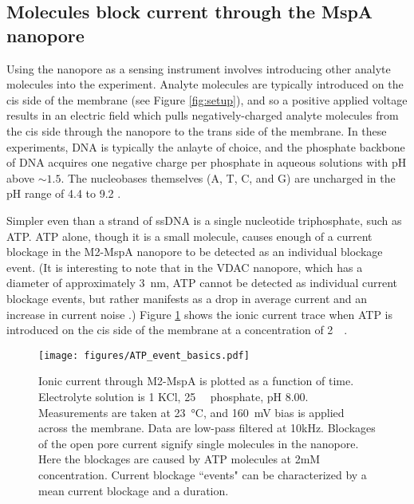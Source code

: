 \subsection{Molecules block current through the MspA nanopore}

Using the nanopore as a sensing instrument involves introducing other analyte molecules into the experiment.  Analyte molecules are typically introduced on the cis side of the membrane (see Figure \ref{fig:setup}), and so a positive applied voltage results in an electric field which pulls negatively-charged analyte molecules from the cis side through the nanopore to the trans side of the membrane.  In these experiments, DNA is typically the anlayte of choice, and the phosphate backbone of DNA acquires one negative charge per phosphate in aqueous solutions with pH above $\sim 1.5$.  The nucleobases themselves (A, T, C, and G) are uncharged in the pH range of \num{4.4} to \num{9.2} \citep{Verdolino2008, Acharya2004}.

Simpler even than a strand of ssDNA is a single nucleotide triphosphate, such as ATP.  ATP alone, though it is a small molecule, causes enough of a current blockage in the M2-MspA nanopore to be detected as an individual blockage event.  (It is interesting to note that in the VDAC nanopore, which has a diameter of approximately \SI{3}{\nm}, ATP cannot be detected as individual current blockage events, but rather manifests as a drop in average current and an increase in current noise \citep{Rostovtseva1998, Rostovtseva2002}.)  Figure \ref{fig:mspa_event_basics} shows the ionic current trace when ATP is introduced on the cis side of the membrane at a concentration of \SI{2}{\milli\Molar}.

\begin{figure}[h]
\begin{centering}
\texttt{[image: figures/ATP\_event\_basics.pdf]}
\caption[Current blockage events in the MspA nanopore]{Ionic current through M2-MspA is plotted as a function of time.  Electrolyte solution is \SI{1}{\Molar} KCl, \SI{25}{\milli\Molar} phosphate, pH \num{8.00}.  Measurements are taken at \SI{23}{\degreeCelsius}, and \SI{160}{\mV} bias is applied across the membrane.  Data are low-pass filtered at 10kHz.  Blockages of the open pore current signify single molecules in the nanopore.  Here the blockages are caused by ATP molecules at 2mM concentration.  Current blockage ``events" can be characterized by a mean current blockage and a duration.}
\label{fig:mspa_event_basics}
\end{centering}
\end{figure}

